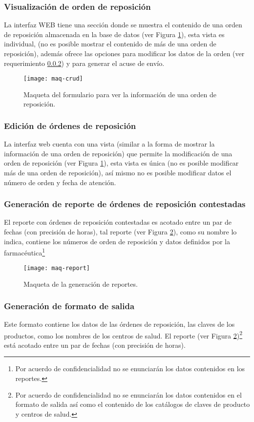 \subsubsection{Visualización de orden de reposición}
La interfaz WEB tiene una sección donde se muestra el contenido de una orden de reposición almacenada en la base de datos (ver Figura \ref{fig:maq-crud}), esta vista es individual, (no es posible mostrar el contenido de más de una orden de reposición), además ofrece las opciones para modificar los datos de la orden (ver requerimiento \ref{req-edicion}) y para generar el acuse de envío.
\begin{figure}[h]
  \centering
  \texttt{[image: maq-crud]} 
  \caption{Maqueta del formulario para ver la información de una orden de reposición.}
  \label{fig:maq-crud}
\end{figure} 

\subsubsection{Edición de órdenes de reposición}\label{req-edicion}
La interfaz web cuenta con una vista (similar a la forma de mostrar la información de una orden de reposición) que permite la modificación de una orden de reposición (ver Figura \ref{fig:maq-crud}), esta vista es única (no es posible modificar más de una orden de reposición), así mismo no es posible modificar datos el número de orden y fecha de atención.

\subsubsection{Generación de reporte de órdenes de reposición contestadas}
El reporte con órdenes de reposición contestadas es acotado entre un par de fechas (con precisión de horas), tal reporte (ver Figura \ref{fig:maq-report}), como su nombre lo indica, contiene los números de orden de reposición y datos definidos por la farmacéutica\footnote{Por acuerdo de confidencialidad no se enunciarán los datos contenidos en los reportes.}
\begin{figure}[h]
  \centering
  \texttt{[image: maq-report]} 
  \caption{Maqueta de la generación de reportes.}
  \label{fig:maq-report}
\end{figure} 

\subsubsection{Generación de formato de salida}
Este formato contiene los datos de las órdenes de reposición, las claves de los productos, como los nombres de los centros de salud. El reporte (ver Figura \ref{fig:maq-report})\footnote{Por acuerdo de confidencialidad no se enunciarán los datos contenidos en el formato de salida así como el contenido de los catálogos de claves de producto y centros de salud.} está acotado entre un par de fechas (con precisión de horas).

